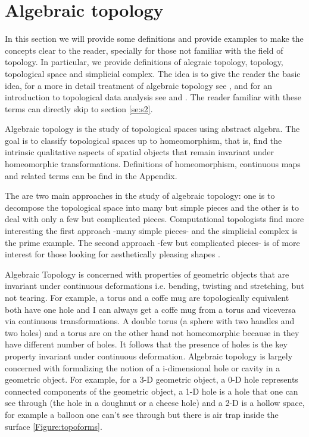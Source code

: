 \documentclass[onecollarge,runningheads]{svjour2}
\begin{document}
\section{Algebraic topology}%
\label{se:at}

In this section we will provide some definitions and provide examples to make the concepts clear to the reader, specially for those not familiar with the field of topology. In particular, we provide definitions of alegraic topology, topology, topological space and simplicial complex. The idea is to give the reader the basic idea, for a more in detail treatment of algebraic topology see \cite{munkres1984elements}, \cite{hatcher2001} and for an introduction to topological data analysis see \cite{carlsson2009topology} and \cite{wasserman2016topological}. The reader familiar with these terms can directly skip to section \ref{se:s2}.
 
Algebraic topology is the study of topological spaces using abstract algebra. The goal is to classify topological spaces up to homeomorphism, that is, find the intrinsic qualitative aspects of spatial objects that remain invariant under homeomorphic transformations. Definitions of homeomorphism, continuous maps and related terms can be find in the Appendix.

The are two main approaches in the study of algebraic topology: one is to decompose the topological space into many but simple pieces and the other is to deal with only a few but complicated pieces. Computational topologists find more interesting the first approach -many simple pieces- and the simplicial complex is the prime example. The second approach -few but complicated pieces- is of more interest for those looking for aesthetically pleasing shapes \cite{edelsbrunner2010computational}. %

Algebraic Topology is concerned with properties of geometric objects that are invariant under continuous deformations i.e. bending, twisting and stretching, but not tearing. 
For example, a torus and a coffe mug are topologically equivalent both have one hole and I can always get a coffe mug from a torus and viceversa via continuous transformations. A double torus (a sphere with two handles and two holes) and a torus are on the other hand not homeomorphic because in they have different number of holes. It follows that the presence of holes is the key property invariant under continuous deformation. Algebraic topology is largely concerned with formalizing the notion of a i-dimensional hole or cavity in a geometric object. For example, for a 3-D geometric object, a 0-D hole represents connected components of the geometric object, a 1-D hole is a hole that one can see through (the hole in a doughnut or a cheese hole) and a 2-D is a hollow space, for example a balloon one can't see through but there is air trap inside the surface \ref{Figure:topoforms}.
\end{document}
